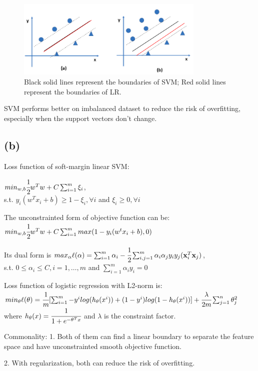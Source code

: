 \documentclass[]{article}
\begin{document}
\begin{figure}[!ht]
    \centering
    \includegraphics[width=0.8\textwidth]{fig/hw1_q6.png}
    \caption{Black solid lines represent the boundaries of SVM; Red solid lines represent the boundaries of LR.}
\end{figure}

SVM performs better on imbalanced dataset to reduce the risk of overfitting, especially when the support vectors don't change. 

\subsection*{(b)}
Loss function of soft-margin linear SVM:

$min_{w,b}\cfrac{1}{2}w^Tw+C\sum_{i=1}^m\xi_i$, \\
s.t. $y_i(w^Tx_i+b)\ge1-\xi_i,\forall i$ and $\xi_i\ge0,\forall i$

The unconstrainted form of objective function can be: $min_{w,b}\cfrac{1}{2}w^Tw+C\sum_{i=1}^mmax(1-y_i(w^tx_i+b), 0)$

Its dual form is $max_\alpha\ell(\alpha)=\sum_{i=1}^m\alpha_i-\cfrac{1}{2}\sum_{i,j=1}^m\alpha_i\alpha_jy_iy_j(\mathbf{x}_i^T\mathbf{x}_j)$, \\
s.t. $0\le\alpha_i\le C,i=1,\dots,m$ and $\sum_{i=1}^m\alpha_iy_i=0$

\vspace{0.5cm}
Loss function of logistic regression with L2-norm is: \\
$min_\theta \ell(\theta) =\cfrac{1}{m}[\sum_{i=1}^m-y^ilog(h_\theta(x^i))+(1-y^i)log(1-h_\theta(x^i))]+\cfrac{\lambda}{2m}\sum_{j=1}^n\theta_j^2$ \\
where $h_\theta(x)=\cfrac{1}{1+e^{-\theta^Tx}}$ and $\lambda$ is the constraint factor. 

Commonality: 
1. Both of them can find a linear boundary to separate the feature space and have unconstrainted smooth objective function. 

2. With regularization, both can reduce the risk of overfitting. 
\end{document}
